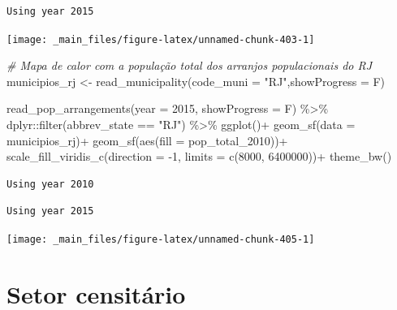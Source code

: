 \documentclass[
  brazilian,
]{book}
\newenvironment{Shaded}{\begin{snugshade}}{\end{snugshade}}
\newcommand{\AttributeTok}[1]{\textcolor[rgb]{0.77,0.63,0.00}{#1}}
\newcommand{\CommentTok}[1]{\textcolor[rgb]{0.56,0.35,0.01}{\textit{#1}}}
\newcommand{\DecValTok}[1]{\textcolor[rgb]{0.00,0.00,0.81}{#1}}
\newcommand{\FunctionTok}[1]{\textcolor[rgb]{0.00,0.00,0.00}{#1}}
\newcommand{\NormalTok}[1]{#1}
\newcommand{\OtherTok}[1]{\textcolor[rgb]{0.56,0.35,0.01}{#1}}
\newcommand{\SpecialCharTok}[1]{\textcolor[rgb]{0.00,0.00,0.00}{#1}}
\newcommand{\StringTok}[1]{\textcolor[rgb]{0.31,0.60,0.02}{#1}}
\begin{document}
\begin{verbatim}
Using year 2015
\end{verbatim}

\begin{center}\texttt{[image: \_main\_files/figure-latex/unnamed-chunk-403-1]} \end{center}

\begin{Shaded}
\begin{Highlighting}[]
\CommentTok{\# Mapa de calor com a população total dos arranjos populacionais do RJ}
\NormalTok{municipios\_rj }\OtherTok{\textless{}{-}} \FunctionTok{read\_municipality}\NormalTok{(}\AttributeTok{code\_muni =} \StringTok{"RJ"}\NormalTok{,}\AttributeTok{showProgress =}\NormalTok{ F)}

\FunctionTok{read\_pop\_arrangements}\NormalTok{(}\AttributeTok{year =} \DecValTok{2015}\NormalTok{,}
                      \AttributeTok{showProgress =}\NormalTok{ F) }\SpecialCharTok{\%\textgreater{}\%}
\NormalTok{  dplyr}\SpecialCharTok{::}\FunctionTok{filter}\NormalTok{(abbrev\_state }\SpecialCharTok{==} \StringTok{"RJ"}\NormalTok{) }\SpecialCharTok{\%\textgreater{}\%} 
  \FunctionTok{ggplot}\NormalTok{()}\SpecialCharTok{+}
  \FunctionTok{geom\_sf}\NormalTok{(}\AttributeTok{data =}\NormalTok{ municipios\_rj)}\SpecialCharTok{+}
  \FunctionTok{geom\_sf}\NormalTok{(}\FunctionTok{aes}\NormalTok{(}\AttributeTok{fill =}\NormalTok{ pop\_total\_2010))}\SpecialCharTok{+}
  \FunctionTok{scale\_fill\_viridis\_c}\NormalTok{(}\AttributeTok{direction =} \SpecialCharTok{{-}}\DecValTok{1}\NormalTok{, }\AttributeTok{limits =} \FunctionTok{c}\NormalTok{(}\DecValTok{8000}\NormalTok{, }\DecValTok{6400000}\NormalTok{))}\SpecialCharTok{+}
  \FunctionTok{theme\_bw}\NormalTok{()}
\end{Highlighting}
\end{Shaded}

\begin{verbatim}
Using year 2010
\end{verbatim}

\begin{verbatim}
Using year 2015
\end{verbatim}

\begin{center}\texttt{[image: \_main\_files/figure-latex/unnamed-chunk-405-1]} \end{center}

\hypertarget{setor-censituxe1rio}{%
\section{Setor censitário}\label{setor-censituxe1rio}}
\end{document}
